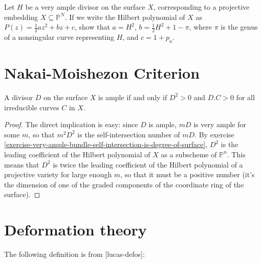 \begin{exercise}
\label{exercise-very-ample-bundle-self-intersection-is-degree-of-surface}
\begin{reference}
\cite[V, Exercise 1.2]{har}
\end{reference}
Let $H$ be a very ample divisor on the surface $X$, corresponding to a
projective embedding $X\subseteq\mathbb{P}^N$. If we write the Hilbert
polynomial of $X$ as $P(z)=\frac{1}{2}az^2+bz+c$, show that $a=H^2$,
$b=\frac{1}{2}H^2+1-\pi$, where $\pi$ is the genus of a nonsingular curve
representing $H$, and $c=1+p_a$.
\end{exercise}

\section{Nakai-Moishezon Criterion}
\label{section-Nakai-Moishezon-criterion}

\begin{theorem}
\label{theorem-Nakai-Moishezon-criterion}
\begin{reference}
\cite[V, Theorem 1.10]{hart}
\end{reference}
A divisor $D$ on the surface $X$ is ample if and only if $D^2>0$ and $D.C>0$ for
all irreducible curves $C$ in $X$.
\end{theorem}

\begin{proof}
The direct implication is easy: since $D$ is ample,  $mD$ is very ample for some
$m$, so that $m^2D^2$ is the self-intersection number of $mD$. By exercise
\ref{exercise-very-ample-bundle-self-intersection-is-degree-of-surface},
 $D^2$ is the leading coefficient of the Hilbert polynomial of $X$ as a 
subscheme of $\mathbb{P}^n$. This means that $D^2$ is twice the leading
coefficient of the Hilbert polynomial of a projective variety for large enough
$m$, so that it must be a positive number (it's the dimension of one of the
graded components of the coordinate ring of the surface).
\end{proof}

\section{Deformation theory}
\label{section-deformation-theory}

The following definition is from [lucas-defos]:

